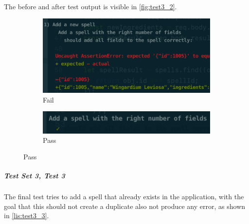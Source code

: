 The before and after test output is visible in \autoref{fig:test3_2}.

\begin{figure}[h]
\caption{Test output for test set 3, test 2}
\label{fig:test3_2}
	\centering
	\begin{subfigure}[b]{0.5\textwidth}
		\centering
		\includegraphics[width=\textwidth]{images/32_fail}
		\caption{Fail}
		\label{fig:test32_fail}
	\end{subfigure}
	\hfill
	\begin{subfigure}[b]{0.5\textwidth}
		\centering
		\includegraphics[width=\textwidth]{images/32_pass}
		\caption{Pass}
		\label{fig:test32_pass}
	\end{subfigure}
\end{figure}


\subparagraph{Test Set 3, Test 3} The final test tries to add a spell that already exists in the application, with the goal that this should not create a duplicate also not produce any error, as shown in \autoref{lis:test3_3}.

